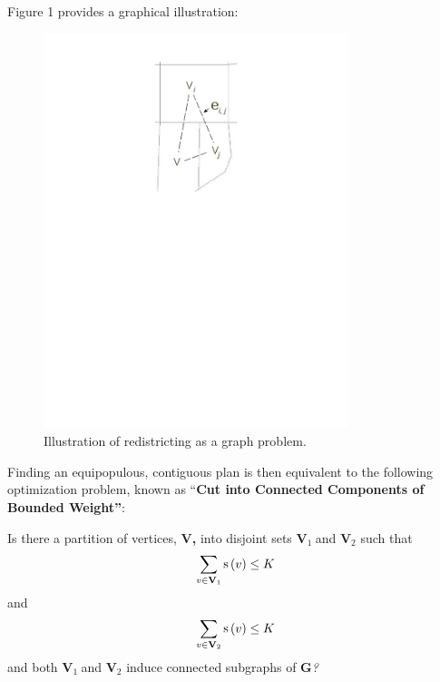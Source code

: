 \documentclass[article]{JSSstyle/jss}
\newcommand\textsubscript[1]{\ensuremath{{}_{\text{#1}}}}
\begin{document}
Figure 1 provides a graphical illustration: 

\begin{figure}[!b]
  \begin{center}
    \includegraphics[width=3.5in]{fig_example.pdf}
  \end{center}

  \caption{\small Illustration of redistricting as a graph problem.}
  \label{fig-example}
\end{figure}

Finding an equipopulous, contiguous plan is then equivalent to the following optimization problem, known as
``\textbf{Cut into Connected Components of Bounded Weight''}\citep[see][]{Altman97}: 

Is there a partition of vertices, \textbf{V,}\textit{ }into disjoint
sets \textbf{V}\textit{\textsubscript{1 }}and
\textbf{V}\textit{\textsubscript{2}} such that 
\[
\sum\limits_{v \in {\bf V}_1 } {{\rm s}\left( v \right)}  \le K
\]
 and 
\[
\sum\limits_{v \in {\bf V}_2 } {{\rm s}\left( v \right)}  \le K
\]
and both
\textbf{V}\textit{\textsubscript{1 }}and
\textbf{V}\textit{\textsubscript{2}} induce connected subgraphs of
\textbf{G}\textit{?}
\end{document}
